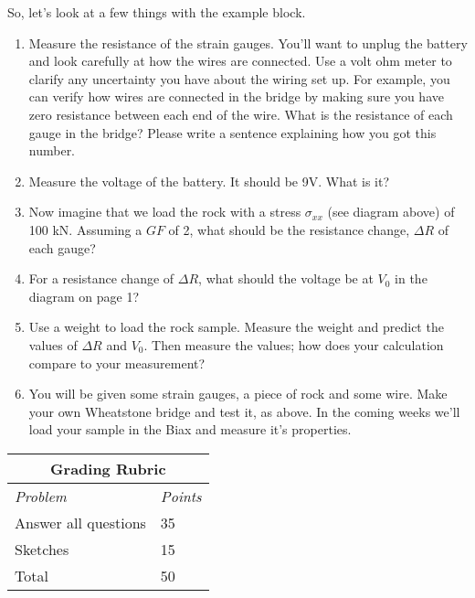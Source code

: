 \documentclass[10pt]{article}
\begin{document}
So, let’s look at a few things with the example block.  
\begin{enumerate}
	\item Measure the resistance of the strain gauges. You’ll want to unplug the battery and look carefully at how the wires are connected. Use a volt ohm meter to clarify any uncertainty you have about the wiring set up. For example, you can verify how wires are connected in the bridge by making sure you have zero resistance between each end of the wire. What is the resistance of each gauge in the bridge?  Please write a sentence explaining how you got this number.
	\item Measure the voltage of the battery. It should be 9V. What is it?
	\item Now imagine that we load the rock with a stress $ \sigma_{xx} $ (see diagram above) of 100 kN.  Assuming a $ GF $ of 2, what should be the resistance change, $ \Delta R $ of each gauge? 
	\item For a resistance change of $ \Delta R $, what should the voltage be at $ V_0 $ in the diagram on page 1?
	\item Use a weight to load the rock sample. Measure the weight and predict the values of $ \Delta R $ and $ V_0 $. Then measure the values; how does your calculation compare to your measurement? 
	\item You will be given some strain gauges, a piece of rock and some wire. Make your own Wheatstone bridge and test it, as above. In the coming weeks we’ll load your sample in the Biax and measure it’s properties.
\end{enumerate}
 
\begin{table}[h!]
	\footnotesize
	\centering
	\begin{tabular}{@{}ll@{}}
		\multicolumn{2}{c}{\textbf{Grading Rubric}} \\ \midrule 
		\multicolumn{1}{l}{\textit{Problem}}   & \textit{Points}   \\ \midrule 
		Answer all questions                    & 35       \\ \midrule
		Sketches            & 15       \\ \midrule
		Total                            & 50       \\ \bottomrule
	\end{tabular}
\end{table}

\clearpage
\end{document}
